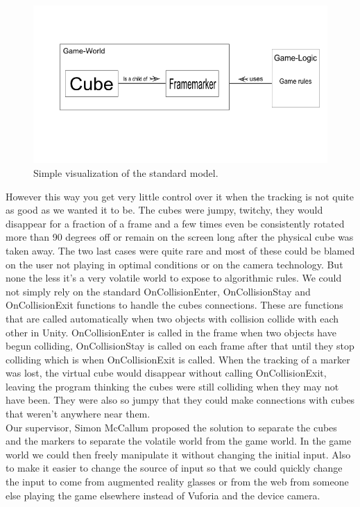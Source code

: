 \begin{figure}[ht] 
        \capstart
        \centering  
        \includegraphics[width=\textwidth]{includes/simpleCubeMarkerModel.png}    
        \caption[Standard Cube-Marker model]{Simple visualization of the standard model.} 
        \label{fig:simple_cube_marker_model} 
\end{figure}

However this way you get very little control over it when the tracking is not quite as good as we wanted it to be. The cubes were jumpy, twitchy, they would disappear for a fraction of a frame and a few times even be consistently rotated more than 90 degrees off or remain on the screen long after the physical cube was taken away. 
The two last cases were quite rare and most of these could be blamed on the user not playing in optimal conditions or on the camera technology.
But none the less it's a very volatile world to expose to algorithmic rules. 
We could not simply rely on the standard OnCollisionEnter, OnCollisionStay and  OnCollisionExit functions to handle the cubes connections.
These are functions that are called automatically when two objects with collision collide with each other in Unity.
OnCollisionEnter is called in the frame when two objects have begun colliding, OnCollisionStay is called on each frame after that until they stop colliding which is when OnCollisionExit is called.
When the tracking of a marker was lost, the virtual cube would disappear without calling OnCollisionExit, leaving the program thinking the cubes were still colliding when they may not have been. 
They were also so jumpy that they could make connections with cubes that weren't anywhere near them.\\
Our supervisor, Simon McCallum proposed the solution to separate the cubes and the markers to separate the volatile world from the game world. 
In the game world we could then freely manipulate it without changing the initial input. 
Also to make it easier to change the source of input so that we could quickly change the input to come from augmented reality glasses or from the web from someone else playing the game elsewhere instead of Vuforia and the device camera.

